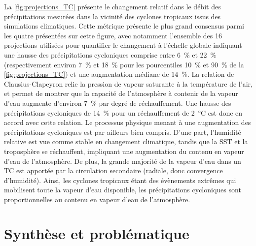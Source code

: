 \documentclass[../main.tex]{subfiles}
\begin{document}
La \cref{fig:projections_TC} présente le changement relatif dans le débit des précipitations mesurées dans la vicinité des cyclones tropicaux issus des
simulations climatiques. Cette métrique présente le plus grand consensus parmi les quatre présentées sur cette figure, avec notamment l'ensemble des \num{16}
projections utilisées pour quantifier le changement à l'échelle globale indiquant une hausse des précipitations cycloniques comprise entre \SI{6}{\percent} et
\SI{22}{\percent} (respectivement environ \SI{7}{\percent} et \SI{18}{\percent} pour les pourcentiles \SI{10}{\percent} et \SI{90}{\percent} de la
\cref{fig:projections_TC}) et une augmentation médiane de \SI{14}{\percent}. La relation de Clausius-Clapeyron relie la pression de vapeur saturante à la
température de l'air, et permet de montrer que la capacité de l'atmosphère à contenir de la vapeur d'eau augmente d'environ \SI{7}{\percent} par degré de
réchauffement. Une hausse des précipitations cycloniques de \SI{14}{\percent} pour un réchauffement de \SI{2}{\degreeCelsius} est donc en accord avec cette
relation. Le processus physique menant à une augmentation des précipitations cycloniques est par ailleurs bien compris. D'une part, l'humidité relative est vue
comme stable en changement climatique, tandis que la SST et la troposphère se réchauffent, impliquant une augmentation du contenu en vapeur d'eau de
l'atmosphère. De plus, la grande majorité de la vapeur d'eau dans un TC est apportée par la circulation secondaire (radiale, donc convergence d'humidité).
Ainsi, les cyclones tropicaux étant des évènements extrêmes qui mobilisent toute la vapeur d'eau disponible, les précipitations cycloniques sont
proportionnelles au contenu en vapeur d'eau de l'atmosphère.

\section{Synthèse et problématique}
\end{document}
